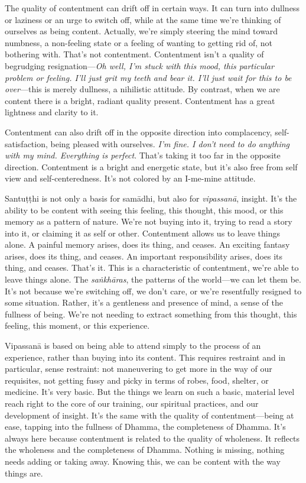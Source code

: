 The quality of contentment can drift off in certain ways. It can turn 
into dullness or laziness or an urge to switch off, while at the same 
time we're thinking of ourselves as being content. Actually, we're 
simply steering the mind toward numbness, a non-feeling state or a 
feeling of wanting to getting rid of, not bothering with. That's not 
contentment. Contentment isn't a quality of begrudging 
resignation---\emph{Oh well, I'm stuck with this mood, this particular 
problem or feeling. I'll just grit my teeth and bear it. I'll just wait 
for this to be over}---this is merely dullness, a nihilistic attitude. 
By contrast, when we are content there is a bright, radiant quality 
present. Contentment has a great lightness and clarity to it.

Contentment can also drift off in the opposite direction into 
complacency, self-satisfaction, being pleased with ourselves. \emph{I'm 
fine. I don't need to do anything with my mind. Everything is perfect}. 
That's taking it too far in the opposite direction. Contentment is a 
bright and energetic state, but it's also free from self view and 
self-centeredness. It's not colored by an I-me-mine attitude.

Santuṭṭhi is not only a basis for samādhi, but also for 
\emph{vipassanā}, insight. It's the ability to be content with seeing 
this feeling, this thought, this mood, or this memory as a pattern of 
nature. We're not buying into it, trying to read a story into it, or 
claiming it as self or other. Contentment allows us to leave things 
alone. A painful memory arises, does its thing, and ceases. An exciting 
fantasy arises, does its thing, and ceases. An important responsibility 
arises, does its thing, and ceases. That's it. This is a characteristic 
of contentment, we're able to leave things alone. The 
\emph{saṅkhāras}, the patterns of the world---we can let them be. 
It's not because we're switching off, we don't care, or we're 
resentfully resigned to some situation. Rather, it's a gentleness and 
presence of mind, a sense of the fullness of being. We're not needing 
to extract something from this thought, this feeling, this moment, or 
this experience.

Vipassanā is based on being able to attend simply to the process of an 
experience, rather than buying into its content. This requires 
restraint and in particular, sense restraint: not maneuvering to get 
more in the way of our requisites, not getting fussy and picky in terms 
of robes, food, shelter, or medicine. It's very basic. But the things 
we learn on such a basic, material level reach right to the core of our 
training, our spiritual practices, and our development of insight. It's 
the same with the quality of contentment---being at ease, tapping into 
the fullness of Dhamma, the completeness of Dhamma. It's always here 
because contentment is related to the quality of wholeness. It reflects 
the wholeness and the completeness of Dhamma. Nothing is missing, 
nothing needs adding or taking away. Knowing this, we can be content 
with the way things are.

